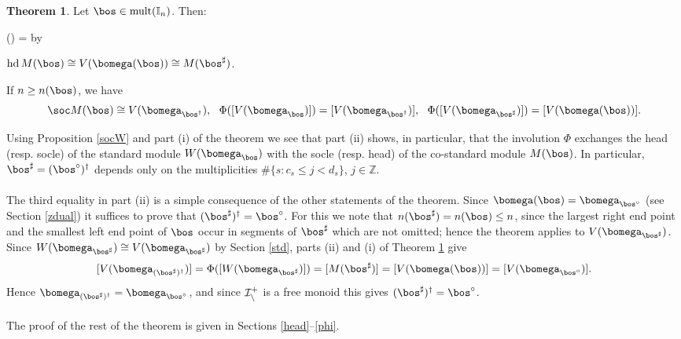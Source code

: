 \documentclass[11pt,reqno]{amsart}
\theoremstyle{definition} \newtheorem*{defn}{Definition}
\theoremstyle{definition}
\newtheorem{thm}{Theorem}
\newcounter{cnt}
\newenvironment{enumerit}{\begin{list}{{\hfill\rm(\roman{cnt})\hfill}}{%
\settowidth{\labelwidth}{{\rm(iv)}}\leftmargin=\labelwidth%
\advance\leftmargin by \labelsep\rightmargin=0pt\usecounter{cnt}}}{\end{list}} \makeatletter
\numberwithin{equation}{section}
\begin{document}
\begin{thm}\label{zdualsoc}
Let $\bos\in{\rm mult}(\mathbb I_n)$. Then:
\begin{enumerit}
\item[(i)] $\operatorname{hd}M(\bos)\cong V(\bomega(\bos))\cong M(\bos^\sharp)$.
\item[(ii)] If $n\ge n(\bos)$, we have  $$\soc M(\bos)\cong V(\bomega_{\bos^\dagger}),\ \ \Phi([V(\bomega_\bos)])=[V(\bomega_{\bos^\dagger})], \ \ \Phi([V(\bomega_{\bos^\sharp})])=[V(\bomega(\bos))].$$

\end{enumerit}
\end{thm}
\noindent Using Proposition \ref{socW} and part (i) of the theorem we see that part (ii) shows, in particular, that the involution $\Phi$ exchanges the head
(resp. socle) of the standard module $W(\bomega_\bos)$ with the socle (resp. head) of the co-standard module
$M(\bos)$. In particular, $\bos^\sharp=(\bos^\circ)^\dagger$ depends only on the multiplicities
$\#\{s: c_s\le j<d_s\}$, $j\in\mathbb Z$. \\\\
The third equality in part (ii) is a simple consequence of the other statements of the theorem. Since $\bomega(\bos)=\bomega_{\bos^\circ}$ (see Section \ref{zdual}) it
suffices to prove that $(\bos^\sharp)^\dagger=\bos^\circ$. For this we note that $n(\bos^\sharp)= n(\bos)\le n$, since the
largest right end point and the smallest left end point of $\bos$ occur in segments of $\bos^\sharp$ which are not
omitted; hence the theorem applies to $V(\bomega_{\bos^\sharp})$. Since $W(\bomega_{\bos^\sharp})\cong V(\bomega_{\bos^\sharp})$
by Section \ref{std}, parts (ii) and (i) of Theorem \ref{zdualsoc} give
$$[V(\bomega_{(\bos^\sharp)^\dagger})]=\Phi([W(\bomega_{\bos^\sharp})])=[M(\bos^\sharp)]=[V(\bomega(\bos))]
=[V(\bomega_{\bos^\circ})].$$
Hence $\bomega_{(\bos^\sharp)^\dagger}=\bomega_{\bos^\circ}$, and since $\cal I_n^+$ is a free monoid this
gives $(\bos^\sharp)^\dagger=\bos^\circ$.\\\\ 
The proof of the rest of the  theorem is given in Sections \ref{head}--\ref{phi}. 
\end{document}
